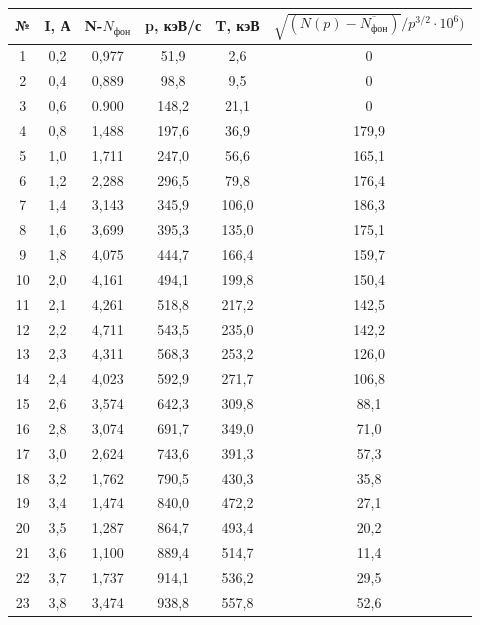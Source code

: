 \documentclass[a4paper, 12pt]{article}%
\begin{document}
\begin{enumerate}
		\begin{longtable}{|c|c|c|c|c|c|}
			\hline
			№   & I, А  & N-$ N_{\text{фон}}$& p, кэВ/с  & T, кэВ  & $\sqrt{(N(p) - \overline{N_{\text{фон}}})}/p^{3/2} \cdot 10^6)$   \\ \hline
			1   & 0,2   & 0,977  & 51,9      & 2,6     & 0     \\ \hline
			2   & 0,4   & 0,889  & 98,8      & 9,5     & 0     \\ \hline
			3   & 0,6   & 0.900  & 148,2     & 21,1    & 0     \\ \hline
			4   & 0,8   & 1,488  & 197,6     & 36,9    & 179,9 \\ \hline
			5   & 1,0   & 1,711  & 247,0     & 56,6    & 165,1 \\ \hline
			6   & 1,2   & 2,288  & 296,5     & 79,8    & 176,4 \\ \hline
			7   & 1,4   & 3,143  & 345,9     & 106,0   & 186,3 \\ \hline
			8   & 1,6   & 3,699  & 395,3     & 135,0   & 175,1 \\ \hline
			9   & 1,8   & 4,075  & 444,7     & 166,4   & 159,7 \\ \hline
			10  & 2,0   & 4,161  & 494,1     & 199,8   & 150,4 \\ \hline
			11  & 2,1   & 4,261  & 518,8     & 217,2   & 142,5 \\ \hline
			12  & 2,2   & 4,711  & 543,5     & 235,0   & 142,2 \\ \hline
			13  & 2,3   & 4,311  & 568,3     & 253,2   & 126,0 \\ \hline
			14  & 2,4   & 4,023  & 592,9     & 271,7   & 106,8 \\ \hline
			15  & 2,6   & 3,574  & 642,3     & 309,8   & 88,1  \\ \hline
			16  & 2,8   & 3,074  & 691,7     & 349,0   & 71,0  \\ \hline
			17  & 3,0   & 2,624  & 743,6     & 391,3   & 57,3  \\ \hline
			18  & 3,2   & 1,762  & 790,5     & 430,3   & 35,8  \\ \hline
			19  & 3,4   & 1,474  & 840,0     & 472,2   & 27,1  \\ \hline
			20  & 3,5   & 1,287  & 864,7     & 493,4   & 20,2  \\ \hline
			21  & 3,6   & 1,100  & 889,4     & 514,7   & 11,4  \\ \hline
			22  & 3,7   & 1,737  & 914,1     & 536,2   & 29,5  \\ \hline
			23  & 3,8   & 3,474  & 938,8     & 557,8   & 52,6  \\ \hline

\end{longtable}
\end{enumerate}
\end{document}
